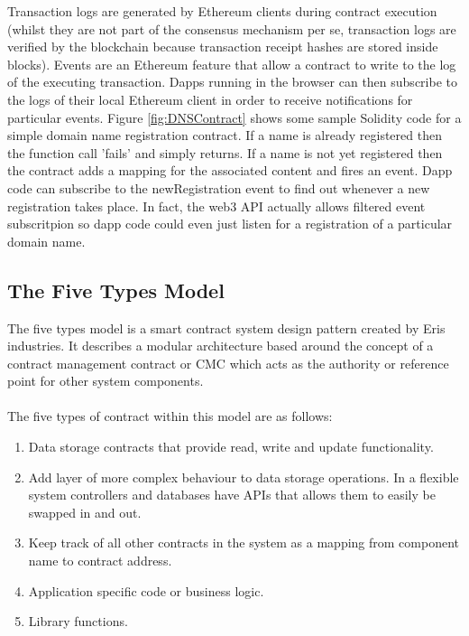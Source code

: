 Transaction logs are generated by Ethereum clients during contract execution (whilst they are not part of the consensus mechanism per se, transaction logs are verified by the blockchain because transaction receipt hashes are stored inside blocks). Events are an Ethereum feature that allow a contract to write to the log of the executing transaction. Dapps running in the browser can then subscribe to the logs of their local Ethereum client in order to receive notifications for particular events. Figure \ref{fig:DNSContract} shows some sample Solidity code for a simple domain name registration  contract. If a name is already registered then the function call 'fails' and simply returns. If a name is not yet registered then the contract adds a mapping for the associated content and fires an event. Dapp code can subscribe to the newRegistration event to find out whenever a new registration takes place. In fact, the web3 API actually allows filtered event subscritpion so dapp code could even just listen for a registration of a particular domain name. \\

\subsection{The Five Types Model}
The five types model is a smart contract system design pattern created by Eris industries\cite{FiveTypes}. It describes a modular architecture based around the concept of a contract management contract or CMC which acts as the authority or reference point for other system components. \\
\\
The five types of contract within this model are as follows: \\
\begin{enumerate}
\item {} Data storage contracts that provide read, write and update functionality. 
\item {} Add layer of more complex behaviour to data storage operations. In a flexible system controllers and databases have APIs that allows them to easily be swapped in and out.
\item {} Keep track of all other contracts in the system as a mapping from component name to contract address.
\item {} Application specific code or business logic.
\item {} Library functions.
\end{enumerate}

